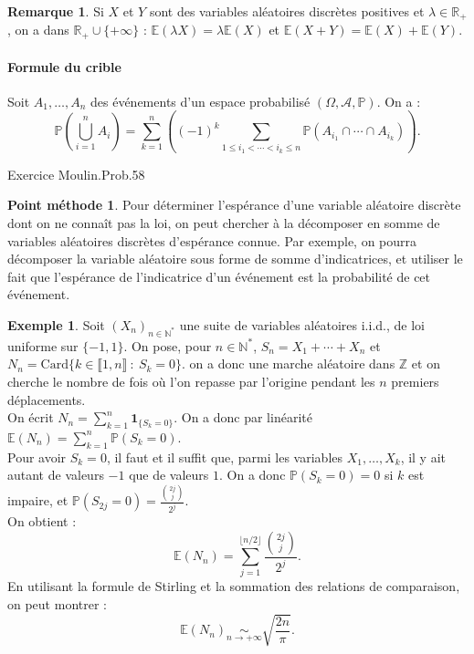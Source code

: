\documentclass[french]{article}
\renewcommand{\P}{\mathbb{P}}
\newcommand{\N}{\mathbb{N}}
\newcommand{\Z}{\mathbb{Z}}
\newcommand{\R}{\mathbb{R}}
\newcommand{\st}{^*}
\newcommand{\E}{\mathbb{E}}
\newcommand{\card}{\text{Card}}
\theoremstyle{plain}
\theoremstyle{definition}
\newtheorem*{ex}{Exemple}
\newtheorem*{met}{Point méthode}
\newtheorem*{rmq}{Remarque}
\theoremstyle{remark}
\begin{document}
\begin{rmq}
	Si $X$ et $Y$ sont des variables aléatoires discrètes positives et $\lambda\in\R_+$, on a dans $\R_+\cup\{+\infty\}$ : $\E(\lambda X)=\lambda\E(X)$ et $\E(X+Y)=\E(X)+\E(Y)$.
\end{rmq}

\paragraph{Formule du crible}
Soit $A_1,\ldots,A_n$ des événements d'un espace probabilisé $(\Omega,\mathcal{A},\P)$. On a :
$$\P\left(\bigcup_{i=1}^nA_i\right)=\sum_{k=1}^{n}\left((-1)^k\sum_{1\leqslant i_1<\cdots<i_k\leqslant n}\P(A_{i_1}\cap\cdots\cap A_{i_k})\right).$$

Exercice Moulin.Prob.58

\begin{met}
	Pour déterminer l'espérance d'une variable aléatoire discrète dont on ne connaît pas la loi, on peut chercher à la décomposer en somme de variables aléatoires discrètes d'espérance connue. Par exemple, on pourra décomposer la variable aléatoire sous forme de somme d'indicatrices, et utiliser le fait que l'espérance de l'indicatrice d'un événement est la probabilité de cet événement.
\end{met}

\begin{ex}
	Soit $(X_n)_{n\in\N\st}$ une suite de variables aléatoires i.i.d., de loi uniforme sur $\{-1,1\}$. On pose, pour $n\in\N\st$, $S_n=X_1+\cdots+X_n$ et $N_n=\card\{k\in\llbracket1,n\rrbracket\ : \ S_k=0\}$. on a donc une marche aléatoire dans $\Z$ et on cherche le nombre de fois où l'on repasse par l'origine pendant les $n$ premiers déplacements.\\
	On écrit $N_n=\displaystyle\sum_{k=1}^{n}\textbf{1}_{\{S_k=0\}}$. On a donc par linéarité $\E(N_n)=\displaystyle\sum_{k=1}^{n}\P(S_k=0)$.\\
	Pour avoir $S_k=0$, il faut et il suffit que, parmi les variables $X_1,\ldots,X_k$, il y ait autant de valeurs $-1$ que de valeurs $1$. On a donc $\P(S_k=0)=0$ si $k$ est impaire, et $\P(S_{2j}=0)=\displaystyle\frac{\binom{2j}{j}}{2^j}$. \\
	On obtient :
	$$\E(N_n)=\sum_{j=1}^{\lfloor n/2\rfloor}\frac{\binom{2j}{j}}{2^j}.$$ En utilisant la formule de Stirling et la sommation des relations de comparaison, on peut montrer : $$\E(N_n)\underset{n\to+\infty}{\sim}\sqrt{\frac{2n}{\pi}}.$$
\end{ex}
\end{document}
